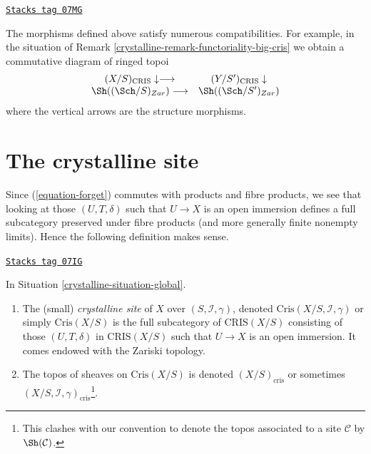 \begin{remark}[Compatibilities]

\label{crystalline-remark-compatibilities-big-cris}
\href{https://stacks.math.columbia.edu/tag/07MG}{\texttt{Stacks tag 07MG}}

The morphisms defined above satisfy numerous compatibilities. For example,
in the situation of Remark \ref{crystalline-remark-functoriality-big-cris}
we obtain a commutative diagram of ringed topoi
$$
\begin{array}{cc}(X/S)_{\text{CRIS}} \downarrow\longrightarrow & (Y/S')_{\text{CRIS}} \downarrow \\ \Sh((\Sch/S)_{Zar}) \longrightarrow & \Sh((\Sch/S')_{Zar})\end{array}
$$
where the vertical arrows are the structure morphisms.
\end{remark}

\section{The crystalline site}
\label{crystalline-section-site}
Since (\ref{equation-forget}) commutes with products and fibre
products, we see that looking at those $(U, T, \delta)$ such that
$U \to X$ is an open immersion defines a full
subcategory preserved under fibre products (and more generally
finite nonempty limits). Hence the following
definition makes sense.

\begin{definition}
\label{crystalline-definition-crystalline-site}
\href{https://stacks.math.columbia.edu/tag/07IG}{\texttt{Stacks tag 07IG}}

In Situation \ref{crystalline-situation-global}.
\begin{enumerate}
\item The (small) {\it crystalline site} of $X$ over
$(S, \mathcal{I}, \gamma)$, denoted $\text{Cris}(X/S, \mathcal{I}, \gamma)$
or simply $\text{Cris}(X/S)$ is the full subcategory of $\text{CRIS}(X/S)$
consisting of those $(U, T, \delta)$ in $\text{CRIS}(X/S)$ such that
$U \to X$ is an open immersion. It comes endowed with the Zariski topology.
\item The topos of sheaves on $\text{Cris}(X/S)$ is denoted
$(X/S)_{\text{cris}}$ or sometimes
$(X/S, \mathcal{I}, \gamma)_{\text{cris}}$\footnote{This clashes with
our convention to denote the topos associated to a site $\mathcal{C}$
by $\Sh(\mathcal{C})$.}.
\end{enumerate}
\end{definition}

